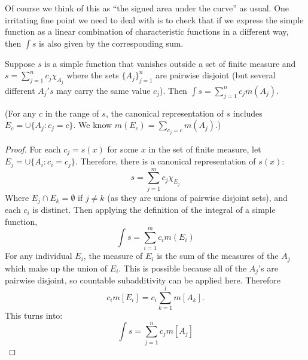 \begin{rmk}%
	Of course we think of this as ``the signed area under the curve'' as usual. 
	One irritating fine point we need to deal with is to check that if we express 
	the simple function as a linear combination of characteristic functions in a 
	different way, then $\int s$ is also given by the corresponding sum. 
\end{rmk}

\begin{pblm}\label{p:simplefuncint}%
	Suppose $s$ is a simple function that vanishes outside a set of finite 
	measure and $s = \sum\limits_{j=1}^nc_j\chi_{A_j}$ where the sets $\{A_j\}_{j=1}^n$ 
	are pairwise disjoint (but several different $A_j's$ may carry the same value $c_j$). 
	Then $\int s = \sum\limits_{j=1}^n c_j m(A_j).$ 

	\noindent (For any $c$ in the range of $s$, the canonical representation of $s$ 
	includes $E_c = \cup\{A_j: c_j = c\}$. We know $m(E_c) = \sum\limits_{c_j = c} m(A_j).$)
\begin{proof}
	For each $c_{j} = s(x)$ for some $x$ in the set of finite measure, let 
	$E_{j} = \cup\{ A_{i}: c_{i} = c_{j} \}$. 
	Therefore, there is a canonical representation of $s(x)$: 
	\begin{equation*}
		s = \sum\limits_{j=1}^{m} c_{j}\chi_{E_j}
	\end{equation*}	
	Where $E_{j} \cap E_{k} = \emptyset$ if $j \neq k$ 
	(as they are unions of pairwise disjoint sets), 
	and each $c_{i}$ is distinct.  Then applying the definition of the 
	integral of a simple function,
	\begin{equation*}
		\int s = \sum_{i=1}^{m} c_{i}m(E_{i}) 		
	\end{equation*}
	For any individual $E_{i}$, the measure of $E_{i}$ is the sum of the measures 
	of the $A_{j}$ which make up the union of $E_{i}$.  This is possible because all of 
	the $A_{j}$'s are pairwise disjoint, so countable subadditivity can be applied here. 
	Therefore 
	\begin{equation*}
		c_{i}m[E_{i}] = c_{i}\sum_{k=1}^{l}m[A_{k}]	.
	\end{equation*}
	This turns into:
	\begin{equation*}
		\int s = \sum_{j=1}^{n}c_{j}m[A_{j}]
	\end{equation*}
\end{proof}
\end{pblm}

\pagebreak

